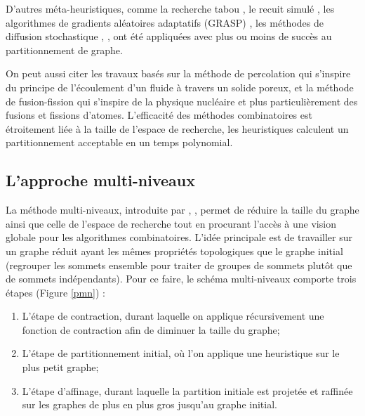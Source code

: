D'autres méta-heuristiques, comme la recherche tabou \citep{BattitiBertossi1999}, le recuit simulé \citep{Bichot2004,Johnson1989,Williams1991}, les algorithmes de gradients aléatoires adaptatifs (GRASP) \citep{AreibiYang2004}, les méthodes de diffusion stochastique \citep{TaoZhao1993}, \citep{Wan2005}, ont été appliquées avec plus ou moins de succès au partitionnement de graphe.

On peut aussi citer les travaux basés sur la méthode de percolation \citep{MeyerhenkeSchamberger2006,Pellegrini2007} qui s'inspire du principe de l'écoulement d'un fluide à travers un solide poreux, et la méthode de fusion-fission \citep{BICHOT2007} qui s'inspire de la physique nucléaire et plus particulièrement des fusions et fissions d'atomes.
L'efficacité des méthodes combinatoires est étroitement liée à la taille de l'espace de recherche, les heuristiques calculent un partitionnement acceptable en un temps polynomial.


\subsection*{L'approche multi-niveaux}
La méthode multi-niveaux, introduite par \citep{BarnardSimon1994,HendricksonLeland1995b}, \citep{VanDriesscheRoose1994}, permet de réduire la taille du graphe ainsi que celle de l'espace de recherche tout en procurant l'accès à une vision globale pour les algorithmes
combinatoires. L'idée principale est de travailler sur un graphe réduit ayant les mêmes propriétés topologiques que le graphe initial (regrouper les sommets ensemble pour traiter de groupes de sommets plutôt que de sommets indépendants).
Pour ce faire, le schéma multi-niveaux comporte trois étapes (Figure \ref{pmn}) :
\begin{enumerate}
	\item  L'étape de contraction, durant laquelle on applique récursivement une fonction de contraction afin de diminuer la taille du graphe;
	\item  L'étape de partitionnement initial, où l'on applique une heuristique sur le plus petit graphe;
	\item  L'étape d'affinage, durant laquelle la partition initiale est projetée et raffinée sur les graphes de plus en plus gros jusqu'au graphe initial.
\end{enumerate}
  
